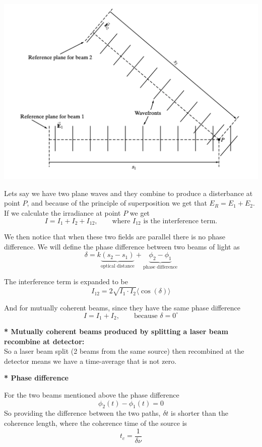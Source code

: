 \documentclass[10pt]{article}
\newcommand*{\lo}[1]{
    \textbf{* #1} \newline
}
\begin{document}
\begin{center}
    \includegraphics*[scale = .5]{imgs/superposition-irradiance.png}
\end{center}

Lets say we have two plane waves and they combine to produce a disterbance at point $P$, and because of the principle of superposition we get that $E_R = E_1 + E_2$. If we calculate the irradiance at point $P$ we get 
\[I = I_1 + I_2 + I_{12}, \qquad \text{where $I_{12}$ is the interference term.}\]

We then notice that when these two fields are parallel there is no phase difference. We will define the phase difference between two beams of light as 
\[\delta = k\underbrace{(s_2 - s_1)}_{\text{optical distance}} + \underbrace{\phi_2 - \phi_1}_{\text{phase difference}}\]

The interference term is expanded to be \[I_{12} = 2\sqrt{I_1 \cdot I_2} \langle \cos(\delta) \rangle \]

And for mutually coherent beams, since they have the same phase difference
\[I = I_1 + I_2, \qquad \text{because } \delta = 0^\circ\]

\textbf{* Mutually coherent beams produced by splitting a laser beam recombine at detector:} \\
So a laser beam split (2 beams from the same source) then recombined at the detector means we have a time-average that is not zero.

\newblock

\lo{Phase difference}
For the two beams mentioned above the phase difference 
\[\phi_2(t) - \phi_1(t) = 0\]
So providing the difference between the two paths, $\delta t$ is shorter than the coherence length, where the coherence time of the source is 
\[t_c = \frac{1}{\delta \nu}\]
\end{document}
